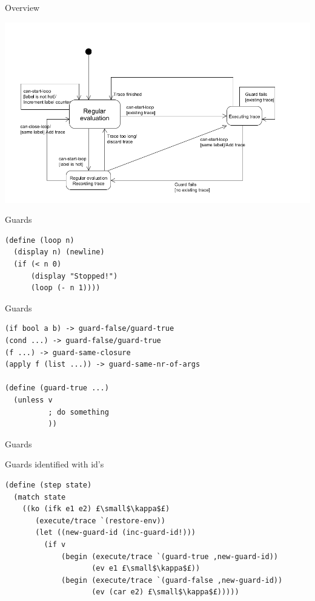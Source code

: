 \documentclass{beamer}
\begin{document}
\begin{frame}{Overview}

\centering
\includegraphics[scale=0.4]{high_level_state_diagram_no_merging.png} 

\end{frame}

\begin{frame}[fragile]{Guards}
\begin{lstlisting}[basicstyle = \small\ttfamily, escapechar = £]
(define (loop n)
  (display n) (newline)
  (if (< n 0)
      (display "Stopped!")
      (loop (- n 1))))
\end{lstlisting}
\end{frame}

\begin{frame}[fragile]{Guards}

\begin{lstlisting}[basicstyle = \small\ttfamily, escapechar = £]
(if bool a b) -> guard-false/guard-true
(cond ...) -> guard-false/guard-true
(f ...) -> guard-same-closure
(apply f (list ...)) -> guard-same-nr-of-args

(define (guard-true ...)
  (unless v
          ; do something
          ))
\end{lstlisting}

\end{frame}

\begin{frame}[fragile]{Guards}

Guards identified with id's

\begin{lstlisting}[basicstyle = \scriptsize\ttfamily, escapechar = £]
(define (step state)
  (match state
    ((ko (ifk e1 e2) £\small$\kappa$£)
       (execute/trace `(restore-env))
       (let ((new-guard-id (inc-guard-id!)))
         (if v
             (begin (execute/trace `(guard-true ,new-guard-id)) 
                    (ev e1 £\small$\kappa$£))
             (begin (execute/trace `(guard-false ,new-guard-id)) 
                    (ev (car e2) £\small$\kappa$£)))))
\end{lstlisting}

\end{frame}
\end{document}
